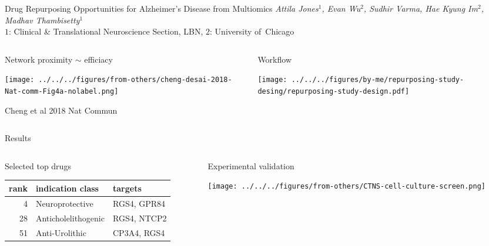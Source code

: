 \documentclass[aspectratio=169]{beamer}
\subtitle{A subtitle may be shorter and more technical}
\author{poster \#1}
\date{Attila Jones}
\begin{document}
\begin{frame}{Drug Repurposing Opportunities for Alzheimer’s Disease from
	Multiomics}
	{\emph{Attila Jones$^1$, Evan Wu$^2$, Sudhir Varma, Hae Kyung Im$^2$, Madhav Thambisetty$^1$}\\
		$1$: Clinical \& Translational Neuroscience Section, LBN, $2$: University
	of~Chicago}

\begin{columns}[t]
\begin{column}{0.35\textwidth}
\begin{center}
	Network proximity $\sim$
	efficiacy
\end{center}

\texttt{[image: ../../../figures/from-others/cheng-desai-2018-Nat-comm-Fig4a-nolabel.png]}

\tiny
Cheng et al 2018 Nat Commun
\end{column}

\begin{column}{0.7\textwidth}
\begin{center}
	Workflow
\end{center}

\texttt{[image: ../../../figures/by-me/repurposing-study-desing/repurposing-study-design.pdf]}
\end{column}
\end{columns}
\end{frame}

\begin{frame}{Results}
	

\begin{columns}[t]
\begin{column}{0.5\textwidth}
\begin{center}
	Selected top drugs
\end{center}
\footnotesize
\begin{tabular}{rll}
	rank & indication class    & targets \\
	\hline
	4    & Neuroprotective     & RGS4, GPR84 \\
	28   & Anticholelithogenic & RGS4, NTCP2 \\
	51   & Anti-Urolithic      & CP3A4, RGS4 \\
\end{tabular}
\end{column}

\begin{column}{0.5\textwidth}
\begin{center}
	Experimental validation\\
\end{center}

\texttt{[image: ../../../figures/from-others/CTNS-cell-culture-screen.png]}
\end{column}
\end{columns}
\end{frame}
\end{document}
